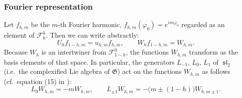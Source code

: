 \documentclass[12pt]{article}
\newcommand{\calF}{\mathcal{F}}
\DeclareMathOperator{\sL}{\mathfrak{sl}}
\newcommand{\GG}{\mathfrak{G}}
\newcommand{\vp}{\varphi}
\def\ie{i.e.\ }
\def\cf{cf.\ }
\begin{document}
\subsubsection{Fourier representation}

Let $f_{h,m}$ be the $m$-th Fourier harmonic, $f_{h,m}(\vp_0)=e^{im\vp_0}$ regarded as an element of $\calF^0_{h}$. Then we can write abstractly:
\begin{equation} \label{UWfourier}
U_{h}f_{1-h,m}=u_{h,m}f_{h,m},\qquad
W_{h}f_{1-h,m}=W_{h,m}.
\end{equation}
Because $W_{h}$ is an intertwiner from $\calF^{0}_{1-h}$, the functions $W_{h,m}$ transform as the basis elements of that space. In particular, the generators $L_{-1}$, $L_{0}$, $L_{1}$ of $\sL_2$ (\ie the complexified Lie algebra of $\GG$) act on the functions $W_{h,m}$ as follows (\cf equation (15) in \cite{SL2R}):
\begin{equation}
L_{0}W_{h,m}=-mW_{h,m},\qquad
L_{\pm1}W_{h,m}=-\bigl(m\pm(1-h)\bigr)W_{h,m\pm1}.
\end{equation}
\end{document}
